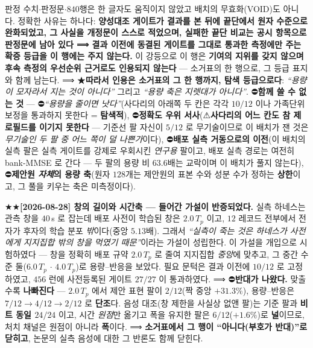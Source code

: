 \documentclass[11pt]{report}
\numberwithin{equation}{chapter}
\numberwithin{figure}{chapter}
\numberwithin{table}{chapter}
\begin{document}
판정 수치$\cdot$판정문$\cdot$$840$행은 한 글자도 움직이지 않았고 배치의 무효화(VOID)도
아니다. 정확한 사유는 하나다: \textbf{양성대조 게이트가 결과를 본 뒤에 끝단에서 원자
수준으로 완화되었고, 그 사실을 개정문이 스스로 적었으며, 실패한 끝단 비교는 공시
항목으로 판정문에 남아 있다 ⟹ 결과 이전에 동결된 게이트를 그대로 통과한 측정에만 주는
확증 등급을 이 행에는 주지 않는다.} 이 강등으로 이 행은 \textbf{기여의 지위를 갖지
않으며 후속 측정의 우선순위 근거로도 인용되지 않는다} --- 소거표의 한 행으로,
그 등급 표지와 함께 남는다.
⟹ ★\textbf{따라서 인용은 소거표의 그 한 행까지, 탐색 등급으로다}: \emph{``용량이 모자라서 지는 것이
아니다''} 그리고 \emph{``용량 축은 지렛대가 아니다''}. ⛔\textbf{함께 쓸 수 없는 것} ---
⛔\emph{``용량을 줄이면 낫다''}(사다리의 아래쪽 두 칸은 각각 $10/12$ 이나 가족단위
보정을 통과하지 못한다 = \textbf{탐색적}), ⛔\textbf{정확도 우위 서사}(⚠\textbf{사다리의
어느 칸도 참 제로필드를 이기지 못한다} --- 기준선 팔 자신이 $5/12$ 로 무기술이므로
이 배치가 잰 것은 \emph{무기술인 두 팔 중 어느 쪽이 덜 나쁜가}이다), ⛔\textbf{배포 실측
거동으로의 이전}(이 배치의 실측 팔은 실측 게이트를 강제로 우회시킨 \emph{연구용} 팔이고,
배포 실측 경로는 여전히 bank-MMSE 로 간다 --- 두 팔의 용량 비 $63.6$배는 교락이며 이
배치가 풀지 않는다), ⛔\textbf{제안원 \emph{자체}의 용량 축}(원자 $128$개는 제안원의
표본 수와 성분 수가 정하는 \textbf{상한}이고, 그 풀을 키우는 축은 미측정이다).

★★\textbf{[2026-08-28] 창의 길이와 시간축 --- 들어간 가설이 반증되었다.} 실측 하네스는
관측 창을 $40$\,s 로 잡는데 배포 사전이 학습된 창은 $2.0\,T_p$ 이고, $12$ 레코드 전부에서
전자가 후자의 학습 분포 \emph{밖}이다(중앙 $5.13$배). 그래서
\emph{``실측이 죽는 것은 하네스가 사전에게 지지집합 밖의 창을 먹였기 때문''}이라는 가설이
성립한다. 이 가설을 개입으로 시험하였다 --- 창을 정확히 배포 규약 $2.0\,T_p$ 로 줄여
지지집합 \emph{중앙}에 맞추고, 그 중간 수준 둘($6.0\,T_p$ $\cdot$ $4.0\,T_p$)로 용량--반응을
보았다. 필요 문턱은 결과 이전에 $10/12$ 로 고정하였고, $456$ 런에 사전등록된 게이트
\textbf{$27/27$} 이 통과하였다.
⟹ ⛔\textbf{반대가 나왔다.} 맞출수록 \textbf{나빠진다} --- $2.0\,T_p$ 에서 제안 표현 팔이
\textbf{$2/12$}(짝 중앙 $+31.3\%$), 용량--반응은 $7/12 \to 4/12 \to 2/12$ 로 \textbf{단조}다.
음성 대조(창 제한을 사실상 없앤 팔)는 기준 팔과 \textbf{비트 동일 $24/24$} 이고, 시간
\emph{원점}만 옮기고 폭을 유지한 팔은 $6/12$($+1.6\%$)로 \textbf{널}이므로, 처치 채널은
원점이 아니라 \textbf{폭}이다. ⟹ \textbf{소거표에서 그 행이 ``아니다(부호가 반대)''로
닫히고}, 논문의 실측 음성에 대한 그 반론도 함께 닫힌다.
\end{document}
